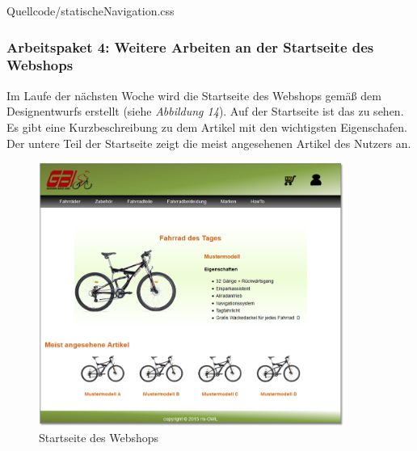 \newpage
\begin{center}
	\begin{lstinputlisting}[language=CSS, caption={Auszug aus der CSS Datei - Die Seitennavigation}]
		{Quellcode/statischeNavigation.css}
	\end{lstinputlisting}
\end{center}



\subsubsection{Arbeitspaket 4: Weitere Arbeiten an der Startseite des Webshops}

Im Laufe der nächsten Woche wird die Startseite des Webshops gemäß dem Designentwurfs erstellt (siehe \textit{Abbildung 14}). Auf der Startseite ist das \grqq{} zu sehen. Es gibt eine Kurzbeschreibung zu dem Artikel mit den wichtigsten Eigenschafen. Der untere Teil der Startseite zeigt die meist angesehenen Artikel des Nutzers an.

\begin{figure}[H]
\begin{center}

\includegraphics[width=10cm]{Bilder/Abbildung5-StartseiteDesWebshops.png}
\end{center}
\caption{Startseite des Webshops}
\end{figure}


